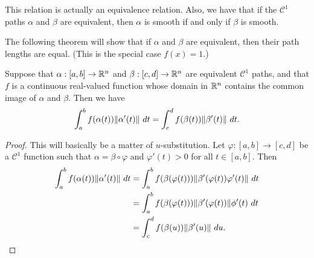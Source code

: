 This relation is actually an equivalence relation. Also, we have that if the $\mathcal{C}^1$ paths $\alpha$ and $\beta$ are equivalent, then $\alpha$ is smooth if and only if $\beta$ is smooth.

The following theorem will show that if $\alpha$ and $\beta$ are equivalent, then their path lengths are equal. (This is the special case $f(x) = 1$.)
\begin{theorem}
Suppose that $\alpha: [a, b] \to \mathbb{R}^n$ and $\beta: [c, d] \to \mathbb{R}^n$ are equivalent $\mathcal{C}^1$ paths, and that $f$ is a continuous real-valued function whose domain in $\mathbb{R}^n$ contains the common image of $\alpha$ and $\beta$. Then we have 
\[\int_a^bf(\alpha(t))\norm{\alpha'(t)}~dt = \int_c^df(\beta(t))\norm{\beta'(t)}~dt.\]
\end{theorem}

\begin{proof}
This will basically be a matter of $u$-substitution. Let $\varphi: [a, b] \to [c, d]$ be a $\mathcal{C}^1$ function such that $\alpha = \beta \circ \varphi$ and $\varphi'(t) > 0$ for all $t \in [a, b]$. Then
\begin{align*}
\int_a^bf(\alpha(t))\norm{\alpha'(t)}~dt &= \int_a^b f(\beta(\varphi(t)))\norm{\beta'(\varphi(t))\varphi'(t)}~dt \\
		&= \int_a^b f(\beta(\varphi(t))) \norm{\beta'(\varphi(t))} \phi'(t)~dt \\
		&= \int_c^d f(\beta(u))\norm{\beta'(u)}~du.
\end{align*}
\end{proof}



